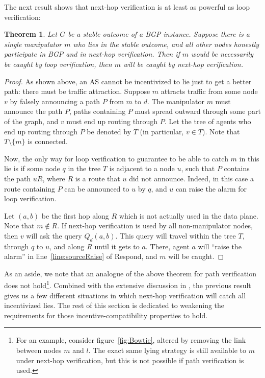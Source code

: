 \documentclass[10pt]{article}
\newtheorem{theorem}{Theorem}
\begin{document}
  The next result shows that next-hop verification is at least as
  powerful as loop verification:
  \begin{theorem}
    Let $G$ be a stable outcome of a BGP instance.
    Suppose there is a single manipulator $m$ who lies in the stable outcome,
    and all other nodes honestly participate in BGP and in next-hop verification.
    Then if $m$ would be necessarily be caught by loop verification,
    then $m$ will be caught by next-hop verification.
  \end{theorem}
  \begin{proof}
    As shown above, an AS cannot be incentivized to lie just to get a better
    path: there must be traffic attraction.
    Suppose $m$ attracts traffic from some node $v$ by falsely announcing a path
    $P$ from $m$ to $d$.
    The manipulator $m$ must announce the path $P$, paths containing $P$
    must spread outward through some part of the graph, and $v$ must end up
    routing through $P$.
    Let the tree of agents who end up routing through $P$ be denoted by $T$
    (in particular, $v\in T$). Note that $T\setminus \{m\}$ is connected.


    Now, the only way for loop verification to guarantee to be able to
    catch $m$ in this lie is if some
    node $q$ in the tree $T$ is adjacent to a node $u$, such that $P$ contains
    the path $uR$, where $R$ is a route that $u$ did not announce. Indeed,
    in this case a route containing $P$ can be announced to $u$ by $q$,
    and $u$ can raise the alarm for loop verification.

    Let $(a,b)$ be the first hop along $R$ which is not actually used in the
    data plane. Note that $m\notin R$.
    If next-hop verification is used by all non-manipulator nodes, then $v$ will
    ask the query $Q_d(a,b)$. This query will travel within the tree $T$,
    through $q$ to $u$, and along $R$ until it gets to $a$.
    There, agent $a$ will ``raise the alarm'' in line~\ref{line:sourceRaise} of {\sc
    Respond}, and $m$ will be caught.
  \end{proof}
  As an aside, we note that an analogue of the above theorem for path
  verification does not hold\footnote{
    For an example, consider figure~\ref{fig:Bowtie}, altered by removing the
    link between nodes $m$ and $l$. The exact same lying strategy is still
    available to $m$ under next-hop verification, but this is not possible if
    path verification is used.
  }.
  Combined with the extensive discussion in \cite{Attraction},
  the previous result gives us a few different situations in which
  next-hop verification will catch all incentivized lies.
  The rest of this section is dedicated to weakening the requirements
  for those incentive-compatibility properties to hold.
\end{document}
